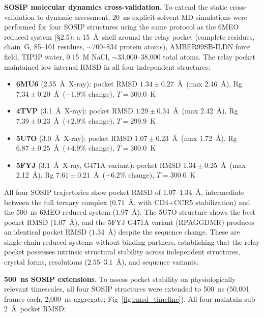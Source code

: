 \documentclass[11pt,a4paper]{article}
\begin{document}
\textbf{SOSIP molecular dynamics cross-validation.} To extend the static cross-validation to dynamic assessment, 20~ns explicit-solvent MD simulations were performed for four SOSIP structures using the same protocol as the 6MEO reduced system (\S2.5): a 15~\AA\ shell around the relay pocket (complete residues, chain~G, 85--101 residues, ${\sim}$700--834 protein atoms), AMBER99SB-ILDN force field, TIP3P water, 0.15~M NaCl, ${\sim}$33,000--38,000 total atoms. The relay pocket maintained low internal RMSD in all four independent structures:

\begin{itemize}[nosep,leftmargin=1.5em]
    \item \textbf{6MU6} (2.55~\AA\ X-ray): pocket RMSD $1.34 \pm 0.27$~\AA\ (max 2.46~\AA), Rg $7.34 \pm 0.20$~\AA\ ($-1.9$\% change), $T = 300.0$~K
    \item \textbf{4TVP} (3.1~\AA\ X-ray): pocket RMSD $1.29 \pm 0.34$~\AA\ (max 2.42~\AA), Rg $7.39 \pm 0.23$~\AA\ ($+2.9$\% change), $T = 299.9$~K
    \item \textbf{5U7O} (3.0~\AA\ X-ray): pocket RMSD $1.07 \pm 0.23$~\AA\ (max 1.72~\AA), Rg $6.87 \pm 0.25$~\AA\ ($+4.9$\% change), $T = 300.0$~K
    \item \textbf{5FYJ} (3.1~\AA\ X-ray, G471A variant): pocket RMSD $1.34 \pm 0.25$~\AA\ (max 2.12~\AA), Rg $7.61 \pm 0.21$~\AA\ ($+6.2$\% change), $T = 300.0$~K
\end{itemize}

All four SOSIP trajectories show pocket RMSD of $1.07$--$1.34$~\AA, intermediate between the full ternary complex ($0.71$~\AA, with CD4+CCR5 stabilization) and the 500~ns 6MEO reduced system ($1.97$~\AA). The 5U7O structure shows the best pocket RMSD ($1.07$~\AA), and the 5FYJ G471A variant (RPAGGDMR) produces an identical pocket RMSD ($1.34$~\AA) despite the sequence change. These are single-chain reduced systems without binding partners, establishing that the relay pocket possesses intrinsic structural stability across independent structures, crystal forms, resolutions ($2.55$--$3.1$~\AA), and sequence variants.

\textbf{500~ns SOSIP extensions.} To assess pocket stability on physiologically relevant timescales, all four SOSIP structures were extended to 500~ns (50,001 frames each, 2,000~ns aggregate; Fig~\ref{fig:rmsd_timeline}). All four maintain sub-2~\AA\ pocket RMSD:
\end{document}

